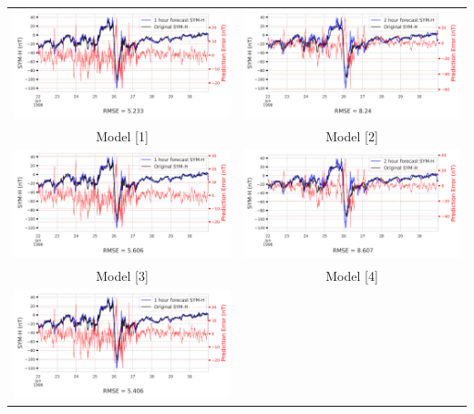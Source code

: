\documentclass[draft,sw]{agutexSI2019}
\begin{document}
\begin{table}
\centering
\begin{tabular}{cc}
\includegraphics[width=0.49\linewidth]{paper_plots/1h_swics/1h_swics_storm_26.png}
&
\includegraphics[width=0.49\linewidth]{paper_plots/2h_swics/2h_swics_storm_26.png}
\\
Model [1] & Model [2]
\vspace*{12pt}
\\
\includegraphics[width=0.49\linewidth]{paper_plots/1h_no_swics/1h_no_swics_storm_26.png}
&
\includegraphics[width=0.49\linewidth]{paper_plots/2h_no_swics/2h_no_swics_storm_26.png}
\\
Model [3] & Model [4]
\vspace*{12pt}
\\
\includegraphics[width=0.49\linewidth]{paper_plots/1h_swics_model_on_no_swics/1h_swics_model_on_no_swics_storm_26.png}

\end{tabular}
\end{table}
\end{document}
